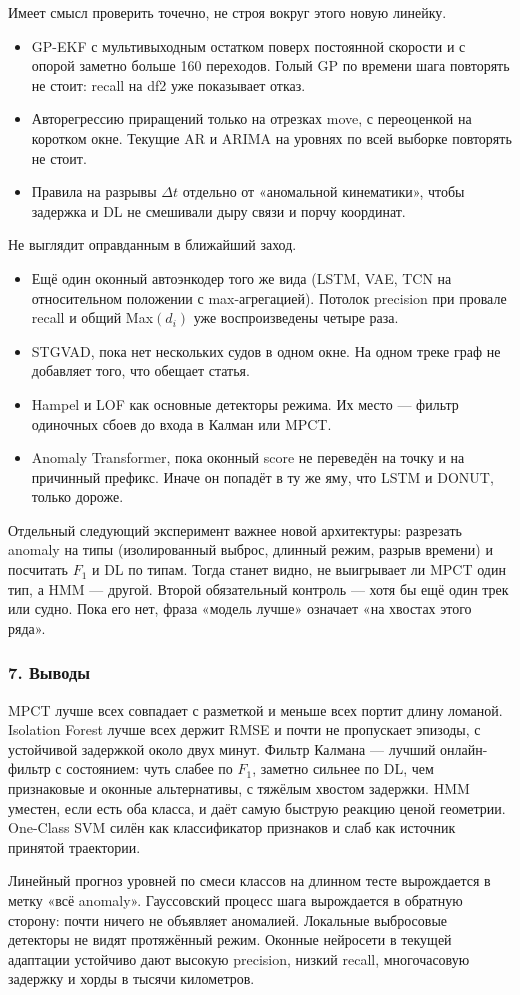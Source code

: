 \documentclass[a4paper,12pt]{report}
\begin{document}
Имеет смысл проверить точечно, не строя вокруг этого новую линейку.

\begin{itemize}
\item GP-EKF с мультивыходным остатком поверх постоянной скорости и с опорой заметно больше 160 переходов. Голый GP по времени шага повторять не стоит: recall на df2 уже показывает отказ.
\item Авторегрессию приращений только на отрезках move, с переоценкой на коротком окне. Текущие AR и ARIMA на уровнях по всей выборке повторять не стоит.
\item Правила на разрывы $\Delta t$ отдельно от «аномальной кинематики», чтобы задержка и DL не смешивали дыру связи и порчу координат.
\end{itemize}
Не выглядит оправданным в ближайший заход.

\begin{itemize}
\item Ещё один оконный автоэнкодер того же вида (LSTM, VAE, TCN на относительном положении с max-агрегацией). Потолок precision при провале recall и общий Max$(d_i)$ уже воспроизведены четыре раза.
\item STGVAD, пока нет нескольких судов в одном окне. На одном треке граф не добавляет того, что обещает статья.
\item Hampel и LOF как основные детекторы режима. Их место — фильтр одиночных сбоев до входа в Калман или MPCT.
\item Anomaly Transformer, пока оконный score не переведён на точку и на причинный префикс. Иначе он попадёт в ту же яму, что LSTM и DONUT, только дороже.
\end{itemize}
Отдельный следующий эксперимент важнее новой архитектуры: разрезать anomaly на типы (изолированный выброс, длинный режим, разрыв времени) и посчитать $F_1$ и DL по типам. Тогда станет видно, не выигрывает ли MPCT один тип, а HMM — другой. Второй обязательный контроль — хотя бы ещё один трек или судно. Пока его нет, фраза «модель лучше» означает «на хвостах этого ряда».

\subsubsection{7. Выводы}

MPCT лучше всех совпадает с разметкой и меньше всех портит длину ломаной. Isolation Forest лучше всех держит RMSE и почти не пропускает эпизоды, с устойчивой задержкой около двух минут. Фильтр Калмана — лучший онлайн-фильтр с состоянием: чуть слабее по $F_1$, заметно сильнее по DL, чем признаковые и оконные альтернативы, с тяжёлым хвостом задержки. HMM уместен, если есть оба класса, и даёт самую быструю реакцию ценой геометрии. One-Class SVM силён как классификатор признаков и слаб как источник принятой траектории.

Линейный прогноз уровней по смеси классов на длинном тесте вырождается в метку «всё anomaly». Гауссовский процесс шага вырождается в обратную сторону: почти ничего не объявляет аномалией. Локальные выбросовые детекторы не видят протяжённый режим. Оконные нейросети в текущей адаптации устойчиво дают высокую precision, низкий recall, многочасовую задержку и хорды в тысячи километров.
\end{document}
